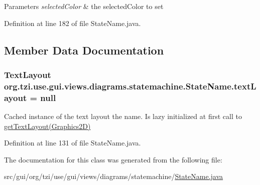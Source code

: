 \begin{DoxyParams}{Parameters}
{\em selected\-Color} & the selected\-Color to set \\
\hline
\end{DoxyParams}


Definition at line 182 of file State\-Name.\-java.



\subsection{Member Data Documentation}
\hypertarget{classorg_1_1tzi_1_1use_1_1gui_1_1views_1_1diagrams_1_1statemachine_1_1_state_name_a03f8658d093629c45bfcdab8ec0f901f}{
\subsubsection[{text\-Layout}]{\setlength{\rightskip}{0pt plus 5cm}Text\-Layout org.\-tzi.\-use.\-gui.\-views.\-diagrams.\-statemachine.\-State\-Name.\-text\-Layout = null\hspace{0.3cm}{\ttfamily [protected]}}}\label{classorg_1_1tzi_1_1use_1_1gui_1_1views_1_1diagrams_1_1statemachine_1_1_state_name_a03f8658d093629c45bfcdab8ec0f901f}
Cached instance of the text layout the name. Is lazy initialized at first call to \hyperlink{classorg_1_1tzi_1_1use_1_1gui_1_1views_1_1diagrams_1_1statemachine_1_1_state_name_a3e3524a7d9e978bdb8a55a127cae50c2}{get\-Text\-Layout(\-Graphics2\-D)} 

Definition at line 131 of file State\-Name.\-java.



The documentation for this class was generated from the following file\-:\begin{DoxyCompactItemize}
\item 
src/gui/org/tzi/use/gui/views/diagrams/statemachine/\hyperlink{_state_name_8java}{State\-Name.\-java}\end{DoxyCompactItemize}
